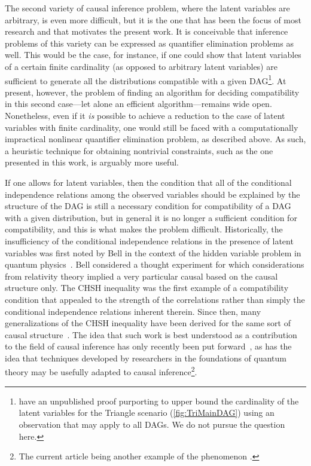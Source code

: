 \documentclass[aps,english,superscriptaddress,onecolumn,twoside,longbibliography,pra,floatfix,fleqn,nofootinbib]{revtex4-1}%
\theoremstyle{definition}
\begin{document}
The second variety of causal inference problem, where the latent variables are arbitrary, is even more difficult, but it is the one that has been the focus of most research and that motivates the present work. It is conceivable that inference problems of this variety can be expressed as quantifier elimination problems as well. This would be the case, for instance, if one could show that latent variables of a certain finite cardinality (as opposed to arbitrary latent variables) are sufficient to generate all the distributions compatible with a given DAG\footnote{\citet{rosset2016finite} have an unpublished proof purporting to upper bound the cardinality of the latent variables for the Triangle scenario (\cref{fig:TriMainDAG}) using an observation that may apply to all DAGs. We do not pursue the question here.}. At present, however, the problem of finding an algorithm for deciding compatibility in this second case---let alone an efficient algorithm---remains wide open.  Nonetheless, even if it {\em is} possible to achieve a reduction to the case of latent variables with finite cardinality, one would still be faced with a computationally impractical nonlinear quantifier elimination problem, as described above. As such, a heuristic technique for obtaining nontrivial constraints, such as the one presented in this work, is arguably more useful.  

If one allows for latent variables, then the condition that all of the conditional independence relations among the observed variables should be explained by the structure of the DAG is still a necessary condition for compatibility of a DAG with a given distribution, but in general it is no longer a sufficient condition for compatibility, and this is what makes the problem difficult. Historically, the insufficiency of the conditional independence relations in the presence of latent variables was first noted by Bell in the context of the hidden variable problem in quantum physics~\cite{bell1964einstein}. Bell considered a thought experiment for which considerations from relativity theory implied a very particular causal based on the causal structure only. The CHSH inequality was the first example of a compatibility condition that appealed to the strength of the correlations rather than simply the conditional independence relations inherent therein.  Since then, many generalizations of the CHSH inequality have been derived for the same sort of causal structure~\cite{Brunner2013Bell}. The idea that such work is best understood as a contribution to the field of causal inference has only recently been put forward~\cite{WoodSpekkens,fritz2012bell,pusey2014gdag,BeyondBellII}, as has the idea that techniques developed by researchers in the foundations of quantum theory may be usefully adapted to causal inference\footnote{The current article being another example of the phenomenon \cite{BeyondBellII,ChavesNoSignalling,chaves2014informationinference,weilenmann2016entropic,kela2016covariance,ChavesPolynomial,TavakoliStarNetworks,RossetNetworks,TavakoliNoncyclicNetworks}.}.
\end{document}
